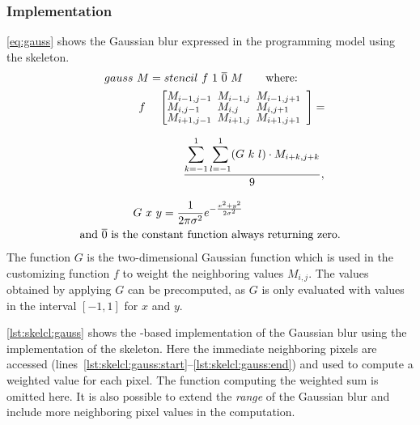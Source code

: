\subsubsection*{\SkelCL Implementation}
\autoref{eq:gauss} shows the Gaussian blur expressed in the \SkelCL programming model using the \stencil skeleton.
\begin{align}
  gauss&\ M = stencil\ f\ 1\ \overline{0}\ M \qquad\text{where:}\nonumber\\
  &
  \begin{array}{ll}%
  f\ &\left[\begin{array}{lll}%
      \hspace{-.5em} M_{i-1,j-1}& \hspace{-.5em} M_{i-1,j} & \hspace{-.5em}M_{i-1,j+1}\vspace{-.25em}\\%
      \hspace{-.5em} M_{i,j-1}& \hspace{-.5em} M_{i,j} & \hspace{-.5em}M_{i,j+1}\vspace{-.25em}\\%
      \hspace{-.5em} M_{i+1,j-1}& \hspace{-.5em} M_{i+1,j} & \hspace{-.5em}M_{i+1,j+1}
    \end{array}\right]  = \\[2em]
          &\qquad \displaystyle\frac{\displaystyle\sum_{k=-1}^{1} \sum_{l=-1}^{1} (G\ k\ l)\cdot M_{i+k, j+k}}{9},
  \end{array} \label{eq:gauss}\\[1em]
  &G\ x\ y = \frac{1}{2\pi \sigma^{2}} e^{-\frac{x^2 + y^2}{2\sigma^2}} \nonumber\\
  \text{and } \overline{0} \text{ is th}&\text{e constant function always returning zero.}\nonumber
\end{align}
The function $G$ is the two-dimensional Gaussian function which is used in the customizing function $f$ to weight the neighboring values $M_{i,j}$.
The values obtained by applying $G$ can be precomputed, as $G$ is only evaluated with values in the interval $[-1, 1]$ for $x$ and $y$.


\autoref{lst:skelcl:gauss} shows the \SkelCL-based implementation of the Gaussian blur using the  implementation of the \stencil skeleton.
Here the immediate neighboring pixels are accessed (lines~\ref{lst:skelcl:gauss:start}--\ref{lst:skelcl:gauss:end}) and used to compute a weighted value for each pixel.
The function computing the weighted sum is omitted here.
It is also possible to extend the \emph{range} of the Gaussian blur and include more neighboring pixel values in the computation.

